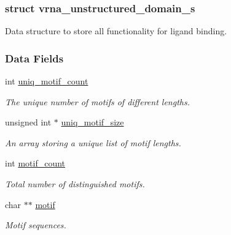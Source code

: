 \subsubsection{struct vrna\+\_\+unstructured\+\_\+domain\+\_\+s}
Data structure to store all functionality for ligand binding. \subsubsection*{Data Fields}
\begin{DoxyCompactItemize}
\item 
\mbox{\label{group__domains__up_ae17005ef8043aca2fc3864804cd5def6}} 
int \hyperlink{group__domains__up_ae17005ef8043aca2fc3864804cd5def6}{uniq\+\_\+motif\+\_\+count}
\begin{DoxyCompactList}\small\item\em The unique number of motifs of different lengths. \end{DoxyCompactList}\item 
\mbox{\label{group__domains__up_a2b484b0e19a47145db7055ada8b14159}} 
unsigned int $\ast$ \hyperlink{group__domains__up_a2b484b0e19a47145db7055ada8b14159}{uniq\+\_\+motif\+\_\+size}
\begin{DoxyCompactList}\small\item\em An array storing a unique list of motif lengths. \end{DoxyCompactList}\item 
\mbox{\label{group__domains__up_a5ad34148ea1d2e501f3e02029449546e}} 
int \hyperlink{group__domains__up_a5ad34148ea1d2e501f3e02029449546e}{motif\+\_\+count}
\begin{DoxyCompactList}\small\item\em Total number of distinguished motifs. \end{DoxyCompactList}\item 
\mbox{\label{group__domains__up_af285436bbdea4436ad2cedec65d48c75}} 
char $\ast$$\ast$ \hyperlink{group__domains__up_af285436bbdea4436ad2cedec65d48c75}{motif}
\begin{DoxyCompactList}\small\item\em Motif sequences. \end{DoxyCompactList}\item 
\mbox{\label{group__domains__up_a6a9f89ab7d147eb0ffd6cf8d77d178c0}} 
$$
\end{DoxyCompactItemize}
